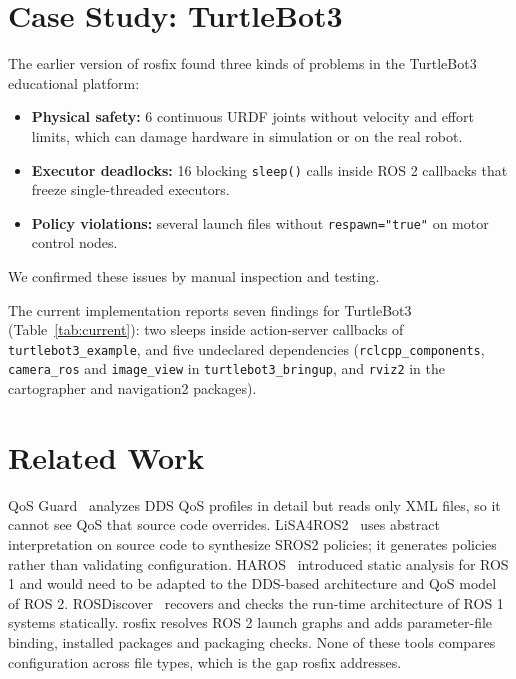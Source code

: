 \documentclass[conference]{IEEEtran}
\newcommand{\code}[1]{\texttt{#1}}
\begin{document}
\section{Case Study: TurtleBot3}

The earlier version of rosfix found three kinds of problems in the TurtleBot3 educational
platform:
\begin{itemize}
\item \textbf{Physical safety:} 6 continuous URDF joints without velocity and effort limits,
  which can damage hardware in simulation or on the real robot.
\item \textbf{Executor deadlocks:} 16 blocking \code{sleep()} calls inside ROS 2 callbacks that
  freeze single-threaded executors.
\item \textbf{Policy violations:} several launch files without \code{respawn="true"} on motor
  control nodes.
\end{itemize}
We confirmed these issues by manual inspection and testing.

The current implementation reports seven findings for TurtleBot3 (Table~\ref{tab:current}): two
sleeps inside action-server callbacks of \code{turtlebot3\_example}, and five undeclared
dependencies (\code{rclcpp\_components}, \code{camera\_ros} and \code{image\_view} in
\code{turtlebot3\_bringup}, and \code{rviz2} in the cartographer and navigation2 packages).

\section{Related Work}

QoS Guard~\cite{lee2025qosguard} analyzes DDS QoS profiles in detail but reads only XML files, so
it cannot see QoS that source code overrides. LiSA4ROS2~\cite{zanatta2024lisa4ros2} uses abstract
interpretation on source code to synthesize SROS2 policies; it generates policies rather than
validating configuration. HAROS~\cite{santos2021haros} introduced static analysis for ROS 1 and
would need to be adapted to the DDS-based architecture and QoS model of ROS 2.
ROSDiscover~\cite{timperley2022rosdiscover} recovers and checks the run-time architecture of ROS 1
systems statically. rosfix resolves ROS 2 launch graphs and adds parameter-file binding,
installed packages and packaging checks. None of these tools compares configuration across file
types, which is the gap rosfix addresses.
\end{document}
